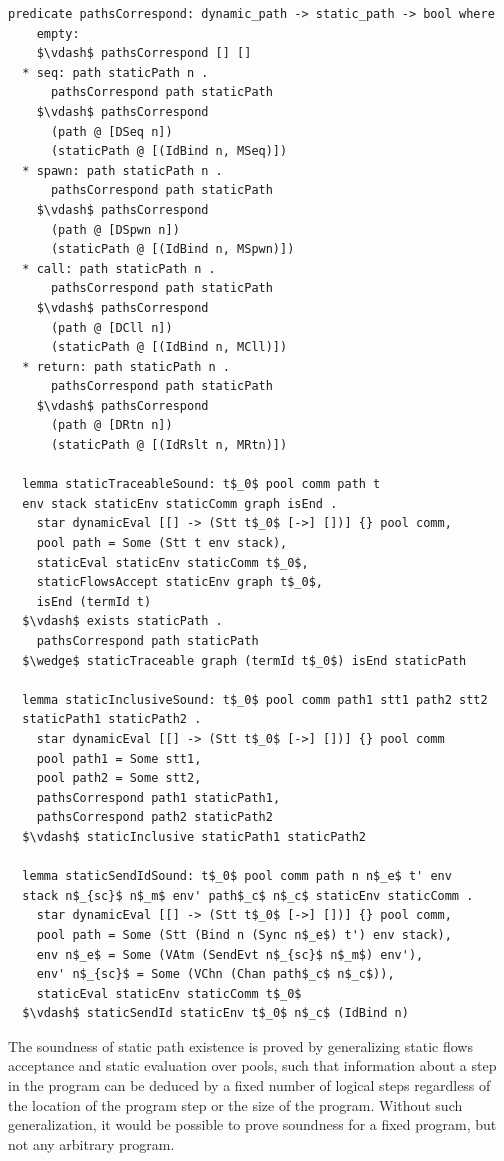 \documentclass[letterpaper, 11pt]{report}
\begin{document}
\begin{lstlisting}[language=logic, mathescape]
  predicate pathsCorrespond: dynamic_path -> static_path -> bool where
    empty:
    $\vdash$ pathsCorrespond [] []
  * seq: path staticPath n .
      pathsCorrespond path staticPath
    $\vdash$ pathsCorrespond
      (path @ [DSeq n])
      (staticPath @ [(IdBind n, MSeq)])
  * spawn: path staticPath n .
      pathsCorrespond path staticPath
    $\vdash$ pathsCorrespond
      (path @ [DSpwn n])
      (staticPath @ [(IdBind n, MSpwn)])
  * call: path staticPath n .
      pathsCorrespond path staticPath
    $\vdash$ pathsCorrespond
      (path @ [DCll n])
      (staticPath @ [(IdBind n, MCll)])
  * return: path staticPath n .
      pathsCorrespond path staticPath
    $\vdash$ pathsCorrespond
      (path @ [DRtn n])
      (staticPath @ [(IdRslt n, MRtn)])

  lemma staticTraceableSound: t$_0$ pool comm path t 
  env stack staticEnv staticComm graph isEnd .
    star dynamicEval [[] -> (Stt t$_0$ [->] [])] {} pool comm, 
    pool path = Some (Stt t env stack),
    staticEval staticEnv staticComm t$_0$,
    staticFlowsAccept staticEnv graph t$_0$,
    isEnd (termId t)
  $\vdash$ exists staticPath . 
    pathsCorrespond path staticPath
  $\wedge$ staticTraceable graph (termId t$_0$) isEnd staticPath

  lemma staticInclusiveSound: t$_0$ pool comm path1 stt1 path2 stt2
  staticPath1 staticPath2 . 
    star dynamicEval [[] -> (Stt t$_0$ [->] [])] {} pool comm
    pool path1 = Some stt1, 
    pool path2 = Some stt2, 
    pathsCorrespond path1 staticPath1, 
    pathsCorrespond path2 staticPath2
  $\vdash$ staticInclusive staticPath1 staticPath2

  lemma staticSendIdSound: t$_0$ pool comm path n n$_e$ t' env
  stack n$_{sc}$ n$_m$ env' path$_c$ n$_c$ staticEnv staticComm .
    star dynamicEval [[] -> (Stt t$_0$ [->] [])] {} pool comm, 
    pool path = Some (Stt (Bind n (Sync n$_e$) t') env stack), 
    env n$_e$ = Some (VAtm (SendEvt n$_{sc}$ n$_m$) env'), 
    env' n$_{sc}$ = Some (VChn (Chan path$_c$ n$_c$)), 
    staticEval staticEnv staticComm t$_0$
  $\vdash$ staticSendId staticEnv t$_0$ n$_c$ (IdBind n)
\end{lstlisting}

The soundness of static path existence is proved by generalizing
static flows acceptance and static evaluation over pools, such that information about a step in
the program can be deduced by a fixed number of logical steps regardless of the location of the
program step or the size of the program. Without such generalization, it would be possible to
prove soundness for a fixed program, but not any arbitrary program.
\end{document}
